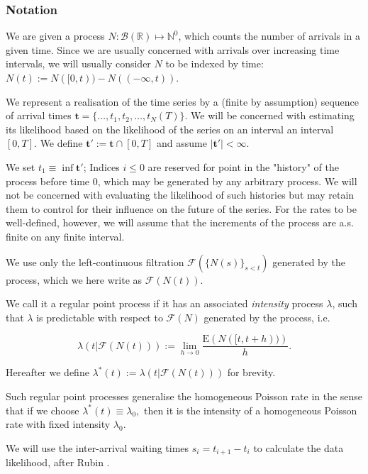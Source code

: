 \documentclass[11pt]{article}
\begin{document}
\subsubsection{Notation}\label{notation}

We are given a process
\(N:\mathcal{B}(\mathbb{R})\mapsto \mathbb{N}^0\), which counts the
number of arrivals in a given time. Since we are usually concerned with
arrivals over increasing time intervals, we will usually consider \(N\)
to be indexed by time: \(N(t):=N([0,t))-N((-\infty, t))\).

We represent a realisation of the time series by a (finite by
assumption) sequence of arrival times
\(\mathbf{t}=\{\dots,t_1, t_2,\dots,t_N(T)\}.\) We will be concerned
with estimating its likelihood based on the likelihood of the series on
an interval an interval \([0,T]\). We define
\(\mathbf{t}':=\mathbf{t}\cap [0,T]\) and assume
\(\left|\mathbf{t}'\right|<\infty.\)

We set \(t_1\equiv \inf \mathbf{t}'\); Indices \(i\leq 0\) are reserved
for point in the "history" of the process before time \(0\), which may
be generated by any arbitrary process. We will not be concerned with
evaluating the likelihood of such histories but may retain them to
control for their influence on the future of the series. For the rates
to be well-defined, however, we will assume that the increments of the
process are a.s. finite on any finite interval.

    We use only the left-continuous filtration
\(\mathcal{F}(\{N(s)\}_{s < t})\) generated by the process, which we
here write as \(\mathcal{F}(N(t)).\)

We call it a regular point process if it has an associated
\emph{intensity} process \(\lambda\), such that \(\lambda\) is
predictable with respect to \(\mathcal{F}(N)\) generated by the process,
i.e. \cite{daley_introduction_2003}

\[\lambda(t|\mathcal{F}(N(t))):=\lim_{h\to 0} \frac{\mathrm E\left(N([t,t+h))\right)}{h}.\]

Hereafter we define \(\lambda^*(t):=\lambda(t|\mathcal{F}(N(t)))\) for
brevity.

Such regular point processes generalise the homogeneous Poisson rate in
the sense that if we choose \(\lambda^*(t)\equiv \lambda_0,\) then it is
the intensity of a homogeneous Poisson rate with fixed intensity
\(\lambda_0\).

    We will use the inter-arrival waiting times \(s_i=t_{i+1}-t_i\) to
calculate the data likelihood, after Rubin \cite{rubin_regular_1972}.
\end{document}
